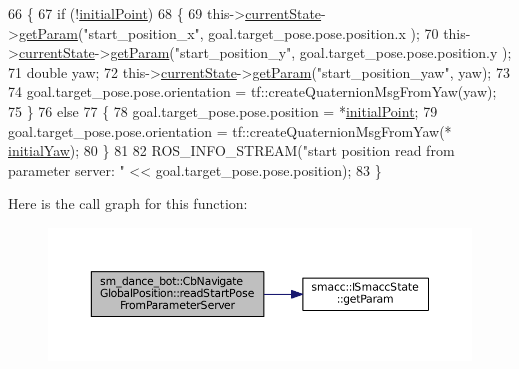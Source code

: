 \begin{DoxyCode}
66   \{
67     \textcolor{keywordflow}{if} (!\hyperlink{classsm__dance__bot_1_1CbNavigateGlobalPosition_a9b81342ca5492d3b9724c488c1f39f4f}{initialPoint})
68     \{
69       this->\hyperlink{classsmacc_1_1SmaccClientBehavior_af76fc9b877542ed5caf033f820c107d0}{currentState}->\hyperlink{classsmacc_1_1ISmaccState_abbb3a24b912c6e8de28f7b86123b6357}{getParam}(\textcolor{stringliteral}{"start\_position\_x"}, goal.target\_pose.pose.position.x
      );
70       this->\hyperlink{classsmacc_1_1SmaccClientBehavior_af76fc9b877542ed5caf033f820c107d0}{currentState}->\hyperlink{classsmacc_1_1ISmaccState_abbb3a24b912c6e8de28f7b86123b6357}{getParam}(\textcolor{stringliteral}{"start\_position\_y"}, goal.target\_pose.pose.position.y
      );
71       \textcolor{keywordtype}{double} yaw;
72       this->\hyperlink{classsmacc_1_1SmaccClientBehavior_af76fc9b877542ed5caf033f820c107d0}{currentState}->\hyperlink{classsmacc_1_1ISmaccState_abbb3a24b912c6e8de28f7b86123b6357}{getParam}(\textcolor{stringliteral}{"start\_position\_yaw"}, yaw);
73 
74       goal.target\_pose.pose.orientation = tf::createQuaternionMsgFromYaw(yaw);
75     \}
76     \textcolor{keywordflow}{else}
77     \{
78       goal.target\_pose.pose.position = *\hyperlink{classsm__dance__bot_1_1CbNavigateGlobalPosition_a9b81342ca5492d3b9724c488c1f39f4f}{initialPoint};
79       goal.target\_pose.pose.orientation = tf::createQuaternionMsgFromYaw(*
      \hyperlink{classsm__dance__bot_1_1CbNavigateGlobalPosition_ad7ac13ee1b0f1a5dfdd47639930ab34c}{initialYaw});
80     \}
81 
82     ROS\_INFO\_STREAM(\textcolor{stringliteral}{"start position read from parameter server: "} << goal.target\_pose.pose.position);
83   \}
\end{DoxyCode}


Here is the call graph for this function\+:
\nopagebreak
\begin{figure}[H]
\begin{center}
\leavevmode
\includegraphics[width=350pt]{classsm__dance__bot_1_1CbNavigateGlobalPosition_a81b78925b3ab8a426f471cb74d0b9756_cgraph}
\end{center}
\end{figure}




